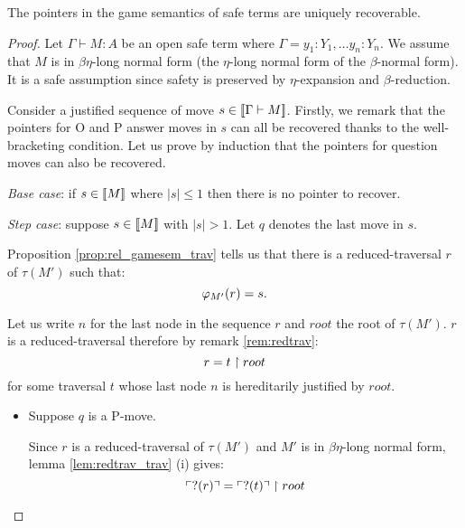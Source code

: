 \begin{prop}
The pointers in the game semantics of safe terms are
uniquely recoverable.
\end{prop}

\begin{proof}
Let $\Gamma \vdash M : A$ be an open safe term where $\Gamma = y_1:Y_1, \ldots y_n:Y_n$.
We assume that $M$ is in $\beta \eta$-long normal form (the $\eta$-long normal form of the $\beta$-normal form).
It is a safe assumption since safety is preserved by $\eta$-expansion and $\beta$-reduction.

Consider a justified sequence of move $s \in {[\![\Gamma \vdash M ]\!]}$. Firstly,
we remark that the pointers for O and P answer moves in $s$ can all be
recovered thanks to the well-bracketing condition.
Let us prove by induction that the pointers for question moves can also be recovered.

\noindent \emph{Base case}: if $s \in {[\![M ]\!]}$ where $|s| \leq 1$ then there is no pointer to recover.

\noindent \emph{Step case}: suppose $s \in {[\![M ]\!]}$ with $|s| > 1$. Let $q$ denotes the last move in $s$.

Proposition \ref{prop:rel_gamesem_trav} tells us that there
is a reduced-traversal $r$ of $\tau(M')$ such that:
$$\varphi_{M'}(r) = s.$$

Let us write $n$ for the last node in the sequence $r$
and $root$ the root of $\tau(M')$.
$r$ is a reduced-traversal therefore by remark \ref{rem:redtrav}:
$$ r = t \upharpoonright  root  $$
for some traversal $t$ whose last node $n$ is hereditarily justified by $root$.

\begin{itemize}
\item Suppose $q$ is a P-move.

Since $r$ is a reduced-traversal of $\tau(M')$ and $M'$ is in $\beta
\eta$-long normal form, lemma \ref{lem:redtrav_trav} (i) gives:
\begin{equation}
 \ulcorner ?(r) \urcorner = \ulcorner ?(t) \urcorner \upharpoonright  root  \label{eq:pre_pview_r}
\end{equation}



\end{itemize}
\end{proof}
